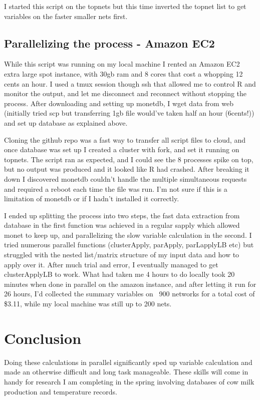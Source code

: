 \documentclass[12pt]{article}
\begin{document}
		I started this script on the topnets but this time inverted the topnet list to get variables on the faster smaller nets first.

		\subsection{Parallelizing the process - Amazon EC2}
		While this script was running on my local machine I rented an Amazon EC2 extra large spot instance, with 30gb ram and 8 cores that cost a whopping 12 cents an hour.
		I used a tmux session though ssh that allowed me to control R and monitor the output, and let me disconnect and reconnect without stopping the process.
		After downloading and setting up monetdb, I wget data from web (initially tried scp but transferring 1gb file would've taken half an hour (6cents!)) and set up database as explained above.


		Cloning the github repo was a fast way to transfer all script files to cloud, and once database was set up I created a cluster with fork, and set it running on topnets.
		The script ran as expected, and I could see the 8 processes spike on top, but no output was produced and it looked like R had crashed.
		After breaking it down I discovered monetdb couldn't handle the multiple simultaneous requests and required a reboot each time the file was run. I'm not sure if this is a limitation of monetdb or if I hadn't installed it correctly.


		I ended up splitting the process into two steps, the fast data extraction from database in the first function was achieved in a regular sapply which allowed monet to keep up, and parallelizing the slow variable calculation in the second.
		I tried numerous parallel functions (clusterApply, parApply, parLapplyLB etc) but struggled with the nested list/matrix structure of my input data and how to apply over it.
		After much trial and error, I eventually managed to get clusterApplyLB to work.
		What had taken me 4 hours to do locally took 20 minutes when done in parallel on the amazon instance, and after letting it run for 26 hours, I'd collected the summary variables on ~900 networks for a total cost of \$3.11, while my local machine was still up to 200 nets.

			
	\section{Conclusion}
		Doing these calculations in parallel significantly sped up variable calculation and made an otherwise difficult and long task manageable.
		These skills will come in handy for research I am completing in the spring involving databases of cow milk production and temperature records.
\end{document}
